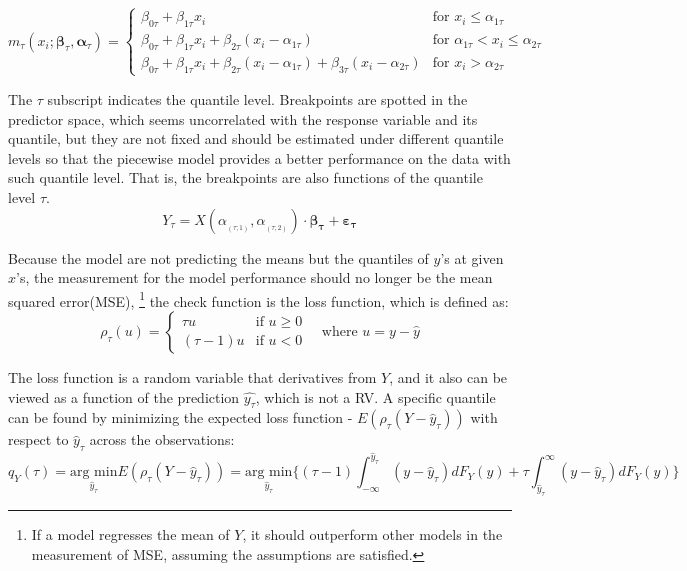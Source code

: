 \[
m_\tau(x_i; \boldsymbol{\beta}_\tau, \boldsymbol{\alpha}_\tau) =
\begin{cases}
\beta_{0\tau} + \beta_{1\tau} x_i & \text{for } x_i \leq \alpha_{1\tau} \\
\beta_{0\tau} + \beta_{1\tau} x_i + \beta_{2\tau}(x_i - \alpha_{1\tau}) & \text{for } \alpha_{1\tau} < x_i \leq \alpha_{2\tau} \\
\beta_{0\tau} + \beta_{1\tau} x_i + \beta_{2\tau}(x_i - \alpha_{1\tau}) + \beta_{3\tau}(x_i - \alpha_{2\tau}) & \text{for } x_i > \alpha_{2\tau}
\end{cases}
\tag{3}
\]

The \(\tau\) subscript indicates the quantile level.
Breakpoints are spotted in the predictor space, which seems uncorrelated with the response variable and its quantile,
but they are not fixed and should be estimated under different quantile levels so that
the piecewise model provides a better performance on the data with such quantile level.
That is, the breakpoints are also functions of the quantile level \(\tau\).
\[
Y_{\tau} = X(\alpha_{_({\tau}; 1)}, \alpha_{_({\tau}; 2)}) \cdot \boldsymbol{\beta_{\tau}} + \boldsymbol{\varepsilon_{\tau}}
\]

Because the model are not predicting the means but the quantiles of $y$'s at given $x$'s,
the measurement for the model performance should no longer be the mean squared error(MSE),
\footnote{If a model regresses the mean of $Y$, it should outperform other models in the measurement of MSE, assuming the assumptions are satisfied.}
the check function is the loss function, which is defined as:
\[
\rho_\tau(u) =
\begin{cases}
\tau u & \text{if } u \geq 0 \\
(\tau - 1) u & \text{if } u < 0
\end{cases}
\quad \text{where } u = y - \hat{y}
\]

The loss function is a random variable that derivatives from $Y$, and it also can be viewed as a function of 
the prediction $\hat{y_{\tau}}$, which is not a RV.
A specific quantile can be found by minimizing the expected loss function - $E({\rho_{\tau}(Y - \hat y_{\tau})})$ with respect to $\hat y_{\tau}$ across
the observations:
\[
    {\displaystyle q_{Y}(\tau )={\underset {\hat y_{\tau}}{\mbox{arg min}}}E(\rho _{\tau }(Y-\hat y_{\tau}))={\underset {\hat y_{\tau}}{\mbox{arg min}}}{\biggl \{}(\tau -1)\int _{-\infty }^{\hat y_{\tau}}(y-\hat y_{\tau})dF_{Y}(y)+\tau \int _{\hat y_{\tau}}^{\infty }(y-\hat y_{\tau})dF_{Y}(y){\biggr \}}} 
\]

